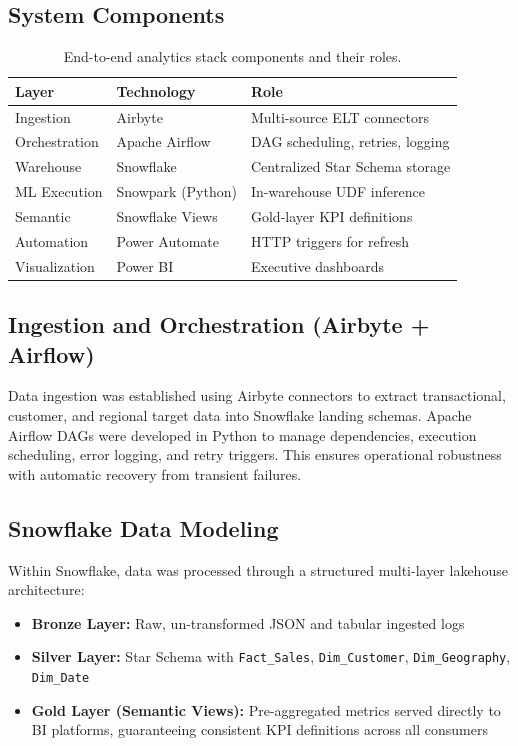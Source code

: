 \documentclass[11pt,a4paper]{article}
\begin{document}
\subsection{System Components}

\begin{table}[H]
\caption{End-to-end analytics stack components and their roles.}
\setlength{\tabcolsep}{22pt}
\renewcommand{\arraystretch}{1.4}
\begin{tabular}{l l l}
\toprule
\textbf{Layer} & \textbf{Technology} & \textbf{Role} \\
\midrule
Ingestion & Airbyte & Multi-source ELT connectors \\
Orchestration & Apache Airflow & DAG scheduling, retries, logging \\
Warehouse & Snowflake & Centralized Star Schema storage \\
ML Execution & Snowpark (Python) & In-warehouse UDF inference \\
Semantic & Snowflake Views & Gold-layer KPI definitions \\
Automation & Power Automate & HTTP triggers for refresh \\
Visualization & Power BI & Executive dashboards \\
\bottomrule
\end{tabular}
\end{table}

\subsection{Ingestion and Orchestration (Airbyte + Airflow)}

Data ingestion was established using Airbyte connectors to extract transactional, customer, and regional target data into Snowflake landing schemas. Apache Airflow DAGs were developed in Python to manage dependencies, execution scheduling, error logging, and retry triggers. This ensures operational robustness with automatic recovery from transient failures.

\subsection{Snowflake Data Modeling}

Within Snowflake, data was processed through a structured multi-layer lakehouse architecture:

\begin{itemize}[leftmargin=*,noitemsep,topsep=2pt]
    \item \textbf{Bronze Layer:} Raw, un-transformed JSON and tabular ingested logs
    \item \textbf{Silver Layer:} Star Schema with \texttt{Fact\_Sales}, \texttt{Dim\_Customer}, \texttt{Dim\_Geography}, \texttt{Dim\_Date}
    \item \textbf{Gold Layer (Semantic Views):} Pre-aggregated metrics served directly to BI platforms, guaranteeing consistent KPI definitions across all consumers
\end{itemize}
\end{document}
